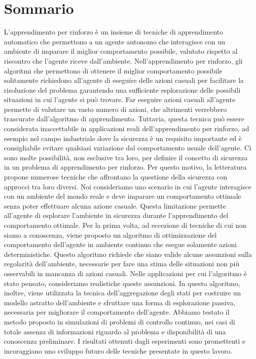 \chapter*{Sommario}
\sloppy L'apprendimento per rinforzo è un insieme di tecniche di apprendimento automatico che permettono a un agente autonomo che interagisce con un ambiente di imparare il miglior comportamento possibile, valutato rispetto al riscontro che l'agente riceve dall'ambiente. Nell'apprendimento per rinforzo, gli algoritmi che permettono di ottenere il miglior comportamento possibile solitamente richiedono all'agente di eseguire delle azioni casuali per facilitare la risoluzione del problema garantendo una sufficiente esplorazione delle possibili situazioni in cui l'agente si può trovare. Far eseguire azioni casuali all'agente permette di valutare un vasto numero di azioni, che altrimenti verrebbero trascurate dall'algoritmo di apprendimento. Tuttavia, questa tecnica può essere considerata inaccettabile in applicazioni reali dell'apprendimento per rinforzo, ad esempio nel campo industriale dove la sicurezza è un requisito importante ed è consigliabile evitare qualsiasi variazione dal comportamento usuale dell'agente. Ci sono molte possibilità, non esclusive tra loro, per definire il concetto di sicurezza in un problema di apprendimento per rinforzo. Per questo motivo, la letteratura propone numerose tecniche che affrontano la questione della sicurezza con approcci tra loro diversi. Noi consideriamo uno scenario in cui l'agente interagisce con un ambiente del mondo reale e deve imparare un comportamento ottimale senza poter effettuare alcuna azione casuale. Questa limitazione permette all'agente di esplorare l'ambiente in sicurezza durante l'apprendimento del comportamento ottimale. Per la prima volta, ad eccezione di tecniche di cui non siamo a conoscenza, viene proposto un algoritmo di ottimizzazione del comportamento dell'agente in ambiente continuo che esegue solamente azioni deterministiche. Questo algoritmo richiede che siano valide alcune assunzioni sulla regolarità dell'ambiente, necessarie per fare una stima delle situazioni non più osservabili in mancanza di azioni casuali. Nelle applicazioni per cui l'algoritmo è stato pensato, consideriamo realistiche queste assunzioni. In questo algoritmo, inoltre, viene utilizzata la tecnica dell'aggregazione degli stati per costruire un modello astratto dell'ambiente e sfruttare una forma di esplorazione passiva, necessaria per migliorare il comportamento dell'agente. Abbiamo testato il metodo proposto in simulazioni di problemi di controllo continuo, nei casi di totale assenza di informazioni riguardo al problema e disponibilità di una conoscenza preliminare. I risultati ottenuti dagli esperimenti sono promettenti e incoraggiano uno sviluppo futuro delle tecniche presentate in questo lavoro.

\endgroup